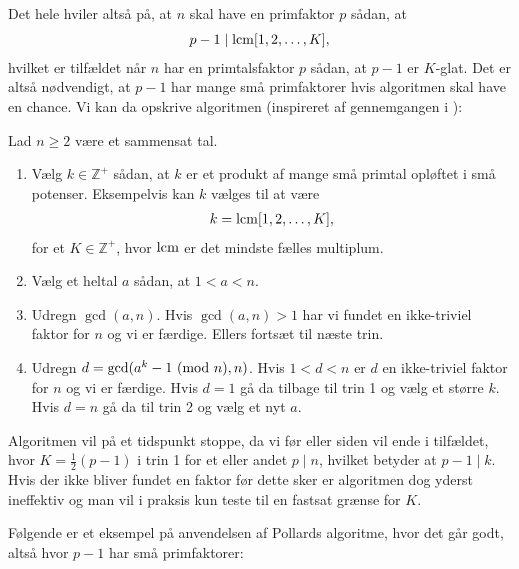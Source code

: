 Det hele hviler altså på, at $n$ skal have en primfaktor $p$ sådan, at 
\begin{align*}
	p-1 \mid \mathrm{lcm}[1, 2, \ldots, K],
\end{align*} 
hvilket er tilfældet når $n$ har en primtalsfaktor $p$ sådan, at $p-1$ er $K$-glat. Det er altså nødvendigt, at $p-1$ har mange små primfaktorer hvis algoritmen skal have en chance. Vi kan da opskrive algoritmen (inspireret af gennemgangen i \cite{Silverman}):
\begin{algorithm}
Lad $n \geq 2$ være et sammensat tal.
\begin{enumerate}
	\item Vælg $k \in \mathbb{Z}^+$ sådan, at $k$ er et produkt
	af mange små primtal opløftet i små potenser. Eksempelvis kan $k$ vælges til at være
	\begin{align*}
		k = \mathrm{lcm} [1, 2, \ldots, K],
	\end{align*}
	for et $K \in \mathbb{Z}^+$, hvor $\mathrm{lcm}$ er det mindste fælles multiplum.
	\item Vælg et heltal $a$ sådan, at $1 < a <n$.
	\item Udregn $\gcd(a, n)$. Hvis $\gcd(a, n) > 1$ har vi fundet en
	ikke-triviel faktor for $n$ og vi er færdige. Ellers fortsæt til næste
	trin.
	\item Udregn $d = \gcd(a^k - 1 \ (\mathrm{mod} \ n), n)$. Hvis $1 < d < n$ er $d$ en ikke-triviel
	faktor for $n$ og vi er færdige. Hvis $d = 1$ gå da tilbage til trin 1
	og vælg et større $k$. Hvis $d = n$ gå da til trin 2 og vælg et nyt $a$. 
\end{enumerate}
\end{algorithm}
Algoritmen vil på et tidspunkt stoppe, da vi før eller siden vil ende i tilfældet, hvor $K=\frac{1}{2}(p-1)$ i trin 1 for et eller andet $p \mid n$, hvilket betyder at $p-1 \mid k$. Hvis der ikke bliver fundet en faktor før dette sker er algoritmen dog yderst ineffektiv og man vil i praksis kun teste til en fastsat grænse for $K$.

Følgende er et eksempel på anvendelsen af Pollards algoritme,
hvor det går godt, altså hvor $p-1$ har små primfaktorer:

